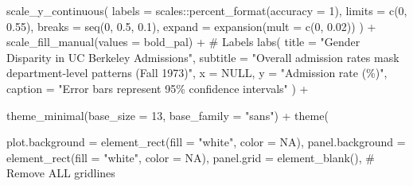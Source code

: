 \documentclass[
  letterpaper,
  DIV=11,
  numbers=noendperiod]{scrreprt}
\newenvironment{Shaded}{\begin{snugshade}}{\end{snugshade}}
\newcommand{\AttributeTok}[1]{\textcolor[rgb]{0.40,0.45,0.13}{#1}}
\newcommand{\CommentTok}[1]{\textcolor[rgb]{0.37,0.37,0.37}{#1}}
\newcommand{\ConstantTok}[1]{\textcolor[rgb]{0.56,0.35,0.01}{#1}}
\newcommand{\DecValTok}[1]{\textcolor[rgb]{0.68,0.00,0.00}{#1}}
\newcommand{\FloatTok}[1]{\textcolor[rgb]{0.68,0.00,0.00}{#1}}
\newcommand{\FunctionTok}[1]{\textcolor[rgb]{0.28,0.35,0.67}{#1}}
\newcommand{\NormalTok}[1]{\textcolor[rgb]{0.00,0.23,0.31}{#1}}
\newcommand{\SpecialCharTok}[1]{\textcolor[rgb]{0.37,0.37,0.37}{#1}}
\newcommand{\StringTok}[1]{\textcolor[rgb]{0.13,0.47,0.30}{#1}}
\begin{document}
\begin{Shaded}
\begin{Highlighting}[]
  \FunctionTok{scale\_y\_continuous}\NormalTok{(}
    \AttributeTok{labels =}\NormalTok{ scales}\SpecialCharTok{::}\FunctionTok{percent\_format}\NormalTok{(}\AttributeTok{accuracy =} \DecValTok{1}\NormalTok{),}
    \AttributeTok{limits =} \FunctionTok{c}\NormalTok{(}\DecValTok{0}\NormalTok{, }\FloatTok{0.55}\NormalTok{),}
    \AttributeTok{breaks =} \FunctionTok{seq}\NormalTok{(}\DecValTok{0}\NormalTok{, }\FloatTok{0.5}\NormalTok{, }\FloatTok{0.1}\NormalTok{),}
    \AttributeTok{expand =} \FunctionTok{expansion}\NormalTok{(}\AttributeTok{mult =} \FunctionTok{c}\NormalTok{(}\DecValTok{0}\NormalTok{, }\FloatTok{0.02}\NormalTok{))}
\NormalTok{  ) }\SpecialCharTok{+}
  \FunctionTok{scale\_fill\_manual}\NormalTok{(}\AttributeTok{values =}\NormalTok{ bold\_pal) }\SpecialCharTok{+}
  \CommentTok{\# Labels}
  \FunctionTok{labs}\NormalTok{(}
    \AttributeTok{title =} \StringTok{"Gender Disparity in UC Berkeley Admissions"}\NormalTok{,}
    \AttributeTok{subtitle =} \StringTok{"Overall admission rates mask department{-}level patterns (Fall 1973)"}\NormalTok{,}
    \AttributeTok{x =} \ConstantTok{NULL}\NormalTok{,}
    \AttributeTok{y =} \StringTok{"Admission rate (\%)"}\NormalTok{,}
    \AttributeTok{caption =} \StringTok{"Error bars represent 95\% confidence intervals"}
\NormalTok{  ) }\SpecialCharTok{+}

  \FunctionTok{theme\_minimal}\NormalTok{(}\AttributeTok{base\_size =} \DecValTok{13}\NormalTok{, }\AttributeTok{base\_family =} \StringTok{"sans"}\NormalTok{) }\SpecialCharTok{+}
  \FunctionTok{theme}\NormalTok{(}

    \AttributeTok{plot.background =} \FunctionTok{element\_rect}\NormalTok{(}\AttributeTok{fill =} \StringTok{"white"}\NormalTok{, }\AttributeTok{color =} \ConstantTok{NA}\NormalTok{),}
    \AttributeTok{panel.background =} \FunctionTok{element\_rect}\NormalTok{(}\AttributeTok{fill =} \StringTok{"white"}\NormalTok{, }\AttributeTok{color =} \ConstantTok{NA}\NormalTok{),}
    \AttributeTok{panel.grid =} \FunctionTok{element\_blank}\NormalTok{(),  }\CommentTok{\# Remove ALL gridlines}
    


\end{Highlighting}
\end{Shaded}
\end{document}
